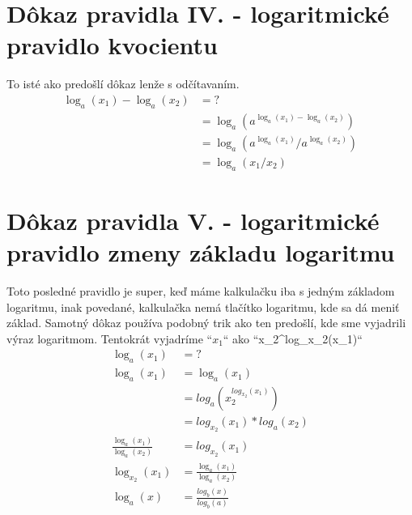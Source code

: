 \documentclass{article}
\begin{document}
\section*{Dôkaz pravidla IV. - logaritmické pravidlo kvocientu}
To isté ako predošlí dôkaz lenže s odčítavaním. \\
\begin{align} 
\log_a(x_1) - \log_a(x_2) & = ? \\
	& = \log_a(a^{\log_a(x_1) - \log_a(x_2)})  \\
	& = \log_a(a^{\log_a(x_1)}/a^{\log_a(x_2)}) \\
	& = \log_a(x_1/x_2)
\end{align}

\section*{Dôkaz pravidla V. - logaritmické pravidlo zmeny základu logaritmu}
Toto posledné pravidlo je super, keď máme kalkulačku iba s jedným základom logaritmu, inak povedané, kalkulačka nemá tlačítko logaritmu, kde sa dá meniť základ. Samotný dôkaz používa podobný trik ako ten predošlí, kde sme vyjadrili výraz logaritmom. Tentokrát vyjadríme ``$x_1$`` ako ``x_2^{log_{x_2}(x_1)}``\\

\begin{align}
\log_a(x_1) & = ? \\
\log_a(x_1) & = \log_a(x_1) \\
& = log_a(x_2^{log_{x_2}(x_1)}) \tag{spomenutá úprava}\\
& = log_{x_2}(x_1) * log_a(x_2)\\
\frac{\log_a(x_1)}{\log_a(x_2)} & = log_{x_2}(x_1) \\
\log_{x_2}(x_1) & = \frac{\log_a(x_1)}{\log_a(x_2)} \tag{len otočíme strany}\\
\log_a(x) & = \frac{log_b(x)}{log_b(a)} \tag{znovu zmeníme písmenka}
\end{align}
\end{document}
